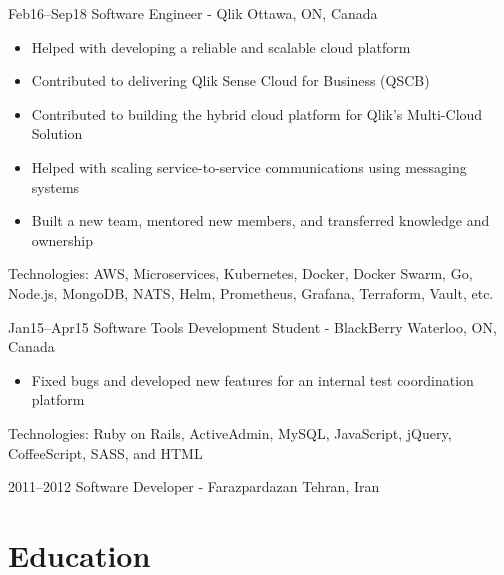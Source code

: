 \documentclass[]{cv-style}                     %
\begin{document}
\begin{entrylist}
  \entry
  {\small Feb16--Sep18}
  {Software Engineer - Qlik}
  {Ottawa, ON, Canada}
  {
    \begin{itemize}
      \item Helped with developing a reliable and scalable cloud platform
      \item Contributed to delivering Qlik Sense Cloud for Business (QSCB)
      \item Contributed to building the hybrid cloud platform for Qlik's Multi-Cloud Solution
      \item Helped with scaling service-to-service communications using messaging systems
      \item Built a new team, mentored new members, and transferred knowledge and ownership
    \end{itemize}
    Technologies: AWS, Microservices, Kubernetes, Docker, Docker Swarm, Go, Node.js, MongoDB, NATS, Helm, Prometheus, Grafana, Terraform, Vault, etc.
   }

  \entry
  {\small Jan15--Apr15}
  {Software Tools Development Student - BlackBerry}
  {Waterloo, ON, Canada}
  {
    \begin{itemize}
      \item Fixed bugs and developed new features for an internal test coordination platform
    \end{itemize}
    Technologies: Ruby on Rails, ActiveAdmin, MySQL, JavaScript, jQuery, CoffeeScript, SASS, and HTML
  }

  \entry
  {\small 2011--2012}
  {Software Developer - Farazpardazan}
  {Tehran, Iran}
  {}


\end{entrylist}



\section{Education}
\end{document}
